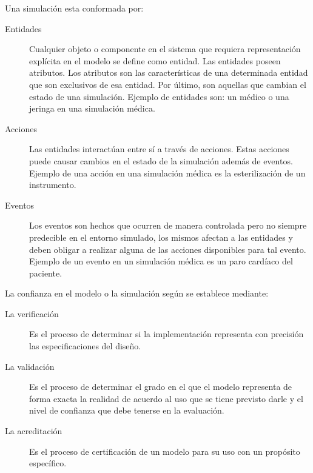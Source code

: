 Una simulación esta conformada por:

\begin{description}

\item[Entidades] Cualquier objeto o componente en el sistema que requiera
	representación explícita en el modelo se define como
	entidad\cite{banks2000dm}. Las entidades poseen atributos. Los atributos
	son las características de una determinada entidad que son exclusivos de
	esa entidad. Por último, son aquellas que cambian el estado de una
	simulación. Ejemplo de entidades son: un médico o una jeringa en una
	simulación médica.

\item[Acciones] Las entidades interactúan entre sí a través de acciones. Estas
	acciones puede causar cambios en el estado de la simulación además de
	eventos. Ejemplo de una acción en una simulación médica es la
	esterilización de un instrumento.

\item[Eventos] Los eventos son hechos que ocurren de manera controlada pero no
	siempre predecible en el entorno simulado, los mismos afectan a las
	entidades y deben obligar a realizar alguna de las acciones disponibles
	para tal evento. Ejemplo de un evento en un simulación médica es un paro
	cardíaco del paciente.

\end{description}

La confianza en el modelo o la simulación según\cite{DoDSysEng2001} se establece
mediante:

\begin{description}

\item[La verificación] Es el proceso de determinar si la implementación
	representa con precisión las especificaciones del diseño. 

\item[La validación] Es el proceso de determinar el grado en el que el modelo
	representa de forma exacta la realidad de acuerdo al uso que se tiene
	previsto darle y el nivel de confianza que debe tenerse en la
	evaluación.

\item[La acreditación] Es el proceso de certificación de un modelo para su uso
	con un propósito específico.

\end{description}



